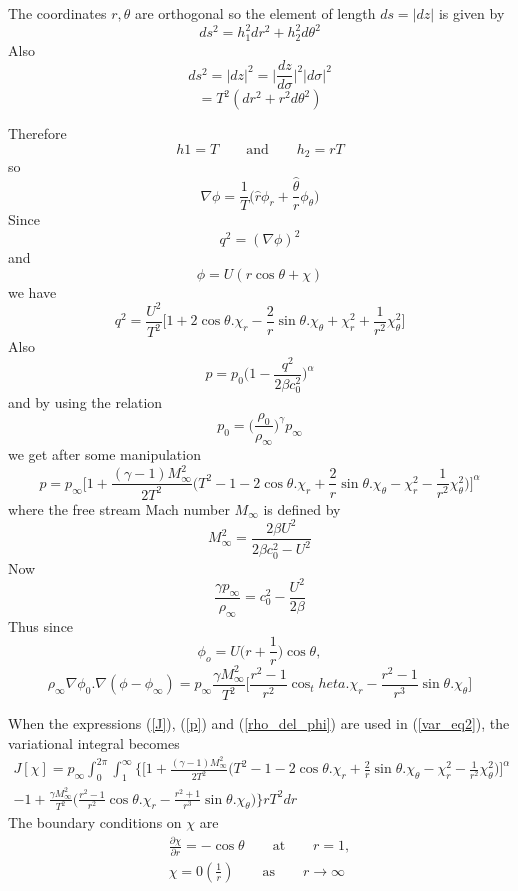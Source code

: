 \documentclass[a4paper]{report}
\begin{document}
	The coordinates $r, \theta$ are orthogonal so the element of length $ds = |dz|$ is given by
	$$
	ds^2 = h_1^2dr^2 + h_2^2d\theta^2
	$$
	Also
	$$
	ds^2 = |dz|^2 = \Biggl|\frac{dz}{d\sigma}\Biggr|^2|d\sigma|^2
	$$
	$$=T^2(dr^2+r^2d\theta^2)$$
	
	Therefore
	$$h1=T \qquad \text{and} \qquad h_2=rT$$	
	so
	$$ \nabla \phi = \frac{1}{T} 
	\Biggl(
		\hat{r}\phi_r + \frac{\hat{\theta}}{r}\phi_\theta
	\Biggr)
	$$
	Since
	$$q^2=(\nabla \phi)^2$$
	and
	$$\phi = U(r\cos \theta+\chi)$$
	we have
	\begin{equation}\label{q2}
		q^2 = 
		\frac{U^2}{T^2}
		\Biggl[
			1 + 2\cos\theta. \chi_r - \frac{2}{r} \sin\theta. \chi_\theta +
			\chi_r^2 + \frac{1}{r^2}\chi_\theta^2
		\Biggr]
	\end{equation}
	Also
	$$
	p = p_0\Biggl(
		1 - \frac{q^2}{2\beta c_0^2}
	\Biggr)^\alpha
	$$
	and by using the relation
	$$
	p_0 = \Biggl(\frac{\rho_0}{\rho_\infty}\Biggr)^\gamma p_\infty
	$$
	we get after some manipulation
	\begin{equation} \label{p}
	p = p_\infty \Biggl[
		1+\frac{(\gamma-1)M_\infty^2}{2T^2}
		\Biggl(
			T^2-1-2\cos\theta.\chi_r +
			\frac{2}{r}\sin\theta.\chi_\theta
			-\chi_r^2-\frac{1}{r^2}\chi_\theta^2
		\Biggr)
	\Biggr]^\alpha
	\end{equation}
	where the free stream Mach number $M_\infty$ is defined by
	$$
	M^2_\infty = \frac{2\beta U^2}{2\beta c_0^2-U^2}
	$$
	Now
	$$
	\frac{\gamma p_\infty}{\rho_\infty} = c_0^2 - \frac{U^2}{2\beta}
	$$
	Thus since
	$$\phi_o = U\Biggl(r+\frac{1}{r}\Biggr)\cos\theta ,$$
	\begin{equation}	\label{rho_del_phi}
		\rho_\infty \nabla\phi_0 . \nabla(\phi-\phi_\infty) = 
		p_\infty \frac{\gamma M^2_\infty}{T^2}
		\Biggl[
			\frac{r^2-1}{r^2}\cos_theta.\chi_r
			-\frac{r^2-1}{r^3}\sin \theta.\chi_\theta
		\Biggr]
	\end{equation}		
	
	When the expressions (\ref{J}), (\ref{p}) and (\ref{rho_del_phi}) are used in (\ref{var_eq2}), the variational integral becomes
	\begin{equation} \label{var_int}
	\begin{split}		
		J[\chi] = p_\infty \int_0^{2\pi} \int_1^\infty
		\Biggl\{
			\Biggl[
				1 + \frac{(\gamma-1)M_\infty^2}{2T^2}
				\Biggl(
					T^2-1-2\cos\theta.\chi_r+\frac{2}{r}\sin\theta.\chi_\theta - \chi_r^2-\frac{1}{r^2}\chi_\theta^2
				\Biggr)
			\Biggr]^\alpha \\
			-1+\frac{\gamma M_\infty^2}{T^2}
			\Biggl(
				\frac{r^2-1}{r^2}\cos\theta.\chi_r
				- \frac{r^2+1}{r^3}\sin\theta.\chi_\theta
			\Biggr)
		\Biggr\}rT^2dr
	\end{split}
	\end{equation}
	The boundary conditions on $\chi$ are
	\begin{equation}\label{bc}
	\begin{split}
		\frac{\partial\chi}{\partial r} = -\cos\theta \qquad \text{at} \qquad r=1, \\
		\chi = 0 \left(\frac{1}{r}\right) \qquad \text{as} \qquad r \rightarrow \infty
	\end{split}
	\end{equation}
	
\end{document}

